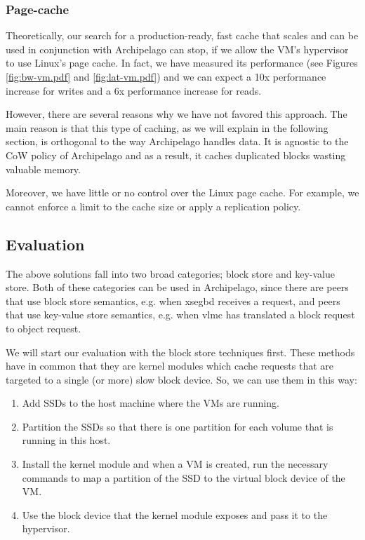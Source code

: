 \subsubsection{Page-cache}

Theoretically, our search for a production-ready, fast cache that scales and 
can be used in conjunction with Archipelago can stop, if we allow the VM's 
hypervisor to use Linux's page cache. In fact, we have measured its performance 
(see Figures \ref{fig:bw-vm.pdf} and \ref{fig:lat-vm.pdf}) and we can expect a 
10x performance increase for writes and a 6x performance increase for reads.

However, there are several reasons why we have not favored this approach. The 
main reason is that this type of caching, as we will explain in the following 
section, is orthogonal to the way Archipelago handles data. It is agnostic to 
the CoW policy of Archipelago and as a result, it caches duplicated blocks 
wasting valuable memory.

Moreover, we have little or no control over the Linux page cache. For example, 
we cannot enforce a limit to the cache size or apply a replication policy.

\subsection{Evaluation}

The above solutions fall into two broad categories; block store and key-value 
store. Both of these categories can be used in Archipelago, since there are 
peers that use block store semantics, e.g.  when xsegbd receives a request, and 
peers that use key-value store semantics, e.g.  when vlmc has translated a 
block request to object request.

We will start our evaluation with the block store techniques first. These 
methods have in common that they are kernel modules which cache requests that 
are targeted to a single (or more) slow block device. So, we can use them in 
this way:

\begin{enumerate}
	\item Add SSDs to the host machine where the VMs are running.
	\item Partition the SSDs so that there is one partition for each volume 
		that is running in this host.
	\item Install the kernel module and when a VM is created, run the necessary 
		commands to map a partition of the SSD to the virtual block device of 
		the VM.
	\item Use the block device that the kernel module exposes and pass it to 
		the hypervisor.
\end{enumerate}

